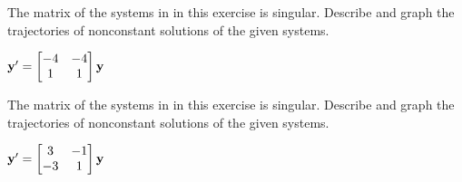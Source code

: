 \documentclass{ximera}
\begin{document}
\begin{problem}\label{exer:10.4.40} 
The matrix of the systems in
in this exercise is singular. Describe
and graph the trajectories of nonconstant solutions  of the given
systems.

${\bf y}'= \begin{bmatrix}-4 &-4\\1&1\end{bmatrix}{\bf
y}$
\end{problem}

\begin{problem}\label{exer:10.4.41}
The matrix of the systems in
in this exercise is singular. Describe
and graph the trajectories of nonconstant solutions  of the given
systems.

${\bf
y}'= \begin{bmatrix}3& -1\\-3 &1\end{bmatrix}{\bf y}$
\end{problem}
\end{document}
